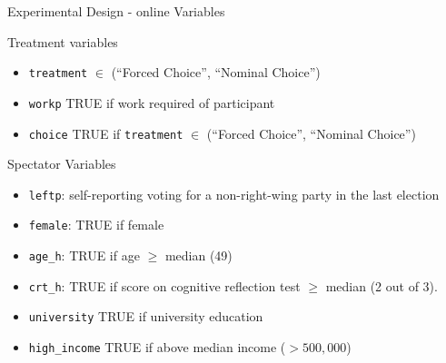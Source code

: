 \documentclass{beamer}
\begin{document}
\begin{frame}{Experimental Design - online Variables}

	\begin{block}{Treatment variables}\small
		\begin{itemize}
			\item \texttt{treatment} $\in$ (“Forced Choice”, “Nominal Choice”)
			\item \texttt{workp} TRUE if work required of participant
			\item \texttt{choice} TRUE if \texttt{treatment} $\in$ (“Forced Choice”, “Nominal Choice”)
		\end{itemize}
		\end{block}

	\begin{block}{Spectator Variables}\small
		\begin{itemize}
			\item \texttt{leftp}: self-reporting voting for a non-right-wing party in the last election
			\item \texttt{female}: TRUE if female
			\item \texttt{age\_h}: TRUE if age $\ge$ median (49)
			\item \texttt{crt\_h}: TRUE if score on cognitive reflection test $\ge$ median (2 out of 3).
			\item  \texttt{university} TRUE if university education
			\item \texttt{high\_income} TRUE if above median income ($>500,000$)
		\end{itemize}

		\end{block}
	\end{frame}
\end{document}
